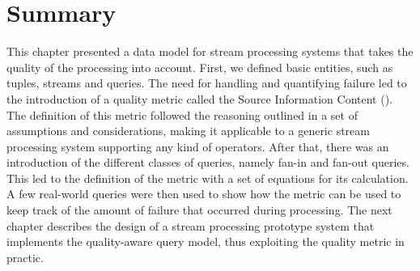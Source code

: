 \section{Summary}

This chapter presented a data model for stream processing systems that takes the quality of the
processing into account.
First, we defined basic entities, such as tuples, streams and queries. The need for handling and
quantifying failure led to the introduction of a quality metric called the Source Information Content
(\sic). The definition of this metric followed the reasoning outlined in a set of assumptions and
considerations, making it applicable to a generic stream processing system supporting any kind of
operators.
After that, there was an introduction of the different classes of queries, namely fan-in and fan-out
queries.
This led to the definition of the \sic metric with a set of equations for its calculation. A few
real-world queries were then used to show how the metric can be used to keep track
of the amount of failure that occurred during processing.
The next chapter describes the design of a stream processing prototype system that implements the
quality-aware query model, thus exploiting the \sic quality metric in practic.
